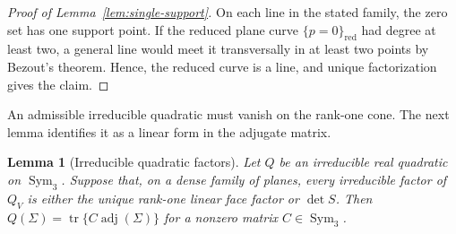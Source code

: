 \documentclass[12pt,a4paper]{article}
\theoremstyle{plain}
\newtheorem{lemma}{Lemma}
\theoremstyle{definition}
\newcommand{\Sym}{\operatorname{Sym}}
\newcommand{\tr}{\operatorname{tr}}
\newcommand{\adjm}{\operatorname{adj}}
\begin{document}
\begin{proof}[Proof of Lemma~\ref{lem:single-support}]
    On each line in the stated family, the zero set has one support point.
    If the reduced plane curve $\{p=0\}_{\mathrm{red}}$ had degree at least two, a general line would meet it transversally in at least two points by Bezout's theorem.
    Hence, the reduced curve is a line, and unique factorization gives the claim.
\end{proof}

An admissible irreducible quadratic must vanish on the rank-one cone.
The next lemma identifies it as a linear form in the adjugate matrix.

\begin{lemma}[Irreducible quadratic factors]
\label{lem:quadratic-factor}
    Let $Q$ be an irreducible real quadratic on $\Sym_3$.
    Suppose that, on a dense family of planes, every irreducible factor of $Q_V$ is either the unique rank-one linear face factor or $\det S$.
    Then $Q(\Sigma)=\tr\{C\adjm(\Sigma)\}$ for a nonzero matrix $C\in\Sym_3$.
\end{lemma}
\end{document}
